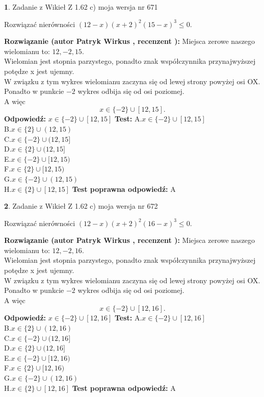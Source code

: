 \documentclass[12pt, a4paper]{article}
\theoremstyle{definition} %
\newtheorem{zad}{}
\newcommand{\zadStart}[1]{\begin{zad}#1\newline}
\newcommand{\zadStop}{\end{zad}}
\newcommand{\rozwStart}[2]{\noindent \textbf{Rozwiązanie (autor #1 , recenzent #2): }\newline}
\newcommand{\rozwStop}{\newline}
\newcommand{\odpStart}{\noindent \textbf{Odpowiedź:}\newline}
\newcommand{\odpStop}{\newline}
\newcommand{\testStart}{\noindent \textbf{Test:}\newline}
\newcommand{\testStop}{\newline}
\newcommand{\kluczStart}{\noindent \textbf{Test poprawna odpowiedź:}\newline}
\newcommand{\kluczStop}{\newline}
\begin{document}
\zadStart{Zadanie z Wikieł Z 1.62 c) moja wersja nr 671}

Rozwiązać nierówności $(12-x)(x+2)^{2}(15-x)^{3}\le0$.
\zadStop
\rozwStart{Patryk Wirkus}{}
Miejsca zerowe naszego wielomianu to: $12, -2, 15$.\\
Wielomian jest stopnia parzystego, ponadto znak współczynnika przy\linebreak najwyższej potędze x jest ujemny.\\ W związku z tym wykres wielomianu zaczyna się od lewej strony powyżej osi OX.\\
Ponadto w punkcie $-2$ wykres odbija się od osi poziomej.\\
A więc $$x \in \{-2\} \cup [12,15].$$
\rozwStop
\odpStart
$x \in \{-2\} \cup [12,15]$
\odpStop
\testStart
A.$x \in \{-2\} \cup [12,15]$\\
B.$x \in \{2\} \cup (12,15)$\\
C.$x \in \{-2\} \cup (12,15]$\\
D.$x \in \{2\} \cup (12,15]$\\
E.$x \in \{-2\} \cup [12,15)$\\
F.$x \in \{2\} \cup [12,15)$\\
G.$x \in \{-2\} \cup (12,15)$\\
H.$x \in \{2\} \cup [12,15]$
\testStop
\kluczStart
A
\kluczStop



\zadStart{Zadanie z Wikieł Z 1.62 c) moja wersja nr 672}

Rozwiązać nierówności $(12-x)(x+2)^{2}(16-x)^{3}\le0$.
\zadStop
\rozwStart{Patryk Wirkus}{}
Miejsca zerowe naszego wielomianu to: $12, -2, 16$.\\
Wielomian jest stopnia parzystego, ponadto znak współczynnika przy\linebreak najwyższej potędze x jest ujemny.\\ W związku z tym wykres wielomianu zaczyna się od lewej strony powyżej osi OX.\\
Ponadto w punkcie $-2$ wykres odbija się od osi poziomej.\\
A więc $$x \in \{-2\} \cup [12,16].$$
\rozwStop
\odpStart
$x \in \{-2\} \cup [12,16]$
\odpStop
\testStart
A.$x \in \{-2\} \cup [12,16]$\\
B.$x \in \{2\} \cup (12,16)$\\
C.$x \in \{-2\} \cup (12,16]$\\
D.$x \in \{2\} \cup (12,16]$\\
E.$x \in \{-2\} \cup [12,16)$\\
F.$x \in \{2\} \cup [12,16)$\\
G.$x \in \{-2\} \cup (12,16)$\\
H.$x \in \{2\} \cup [12,16]$
\testStop
\kluczStart
A
\kluczStop
\end{document}
